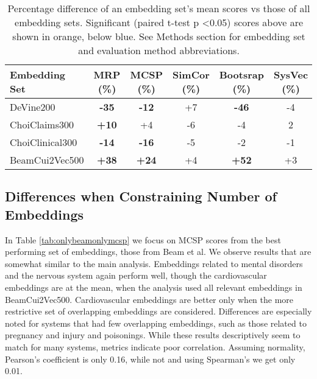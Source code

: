 \documentclass[10pt]{article}
\def\blu#1{{\textbf{\color{blu}#1}}}
\def\ora#1{{\textbf{\color{ora}#1}}}
\begin{document}
\begin{table*}[h]
	\begin{center}
	
	\label{tab:allembedresults}
	\begin{tabular}{l|c|c|c|c|c}
			            Embedding Set &MRP (\%)	        &MCSP (\%)	           &SimCor (\%)	    &Bootsrap (\%)	  &SysVec (\%)\\
			            \hline
		DeVine200       &\blu{-35}   &\blu{-12}	   &+7	    &\blu{-46} &	-4 \\
		ChoiClaims300   &\ora{+10}	& +4	           &-6	    &-4	      &2   \\
		ChoiClinical300	&\blu{-14}	&\blu{-16}	   &-5	    &-2	      &-1  \\
		BeamCui2Vec500	&\ora{+38}	&\ora{+24}	       &+4       &\ora{+52}  &+3   \\
	\end{tabular}
\caption{Percentage difference of an embedding set's mean scores vs those of all embedding sets. Significant (paired t-test p \textless 0.05) scores above are shown in orange, below blue. See Methods section for embedding set and evaluation method abbreviations.}
\end{center}
\end{table*}

\subsection{Differences when Constraining Number of Embeddings}

In Table \ref{tab:onlybeamonlymcsp} we focus on MCSP scores from the best performing set of embeddings, those from Beam et al. We observe results that are somewhat similar to the main  analysis. Embeddings related to mental disorders and the nervous system again perform well, though the cardiovascular embeddings are at the mean, when the analysis used all relevant embeddings in BeamCui2Vec500. Cardiovascular embeddings are better only when the more restrictive set of overlapping embeddings are considered. Differences are especially noted for systems that had few overlapping embeddings, such as those related to pregnancy and injury and poisonings.  While these results descriptively seem to match for many systems, metrics indicate poor correlation. Assuming normality, Pearson's coefficient is only 0.16, while not and using Spearman's we get only 0.01. 
\end{document}
